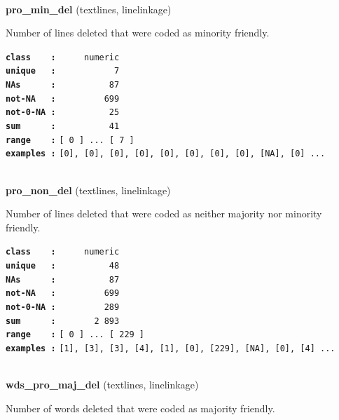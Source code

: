 \documentclass[]{article}
\begin{document}
~

\textbf{pro\_min\_del} (textlines, linelinkage)

Number of lines deleted that were coded as minority friendly.

\textbf{\texttt{class\ \ \ \ :}} \texttt{~~~~~numeric}\\
\textbf{\texttt{unique\ \ \ :}} \texttt{~~~~~~~~~~~7}\\
\textbf{\texttt{NAs\ \ \ \ \ \ :}} \texttt{~~~~~~~~~~87}\\
\textbf{\texttt{not-NA\ \ \ :}} \texttt{~~~~~~~~~699}\\
\textbf{\texttt{not-0-NA\ :}} \texttt{~~~~~~~~~~25}\\
\textbf{\texttt{sum\ \ \ \ \ \ :}} \texttt{~~~~~~~~~~41}\\
\textbf{\texttt{range\ \ \ \ :}}
\texttt{{[}\ 0\ {]}\ ...\ {[}\ 7\ {]}}\\
\textbf{\texttt{examples\ :}}
\texttt{{[}0{]},\ {[}0{]},\ {[}0{]},\ {[}0{]},\ {[}0{]},\ {[}0{]},\ {[}0{]},\ {[}0{]},\ {[}NA{]},\ {[}0{]}\ ...}\\

~

\textbf{pro\_non\_del} (textlines, linelinkage)

Number of lines deleted that were coded as neither majority nor minority
friendly.

\textbf{\texttt{class\ \ \ \ :}} \texttt{~~~~~numeric}\\
\textbf{\texttt{unique\ \ \ :}} \texttt{~~~~~~~~~~48}\\
\textbf{\texttt{NAs\ \ \ \ \ \ :}} \texttt{~~~~~~~~~~87}\\
\textbf{\texttt{not-NA\ \ \ :}} \texttt{~~~~~~~~~699}\\
\textbf{\texttt{not-0-NA\ :}} \texttt{~~~~~~~~~289}\\
\textbf{\texttt{sum\ \ \ \ \ \ :}} \texttt{~~~~~~~2~893}\\
\textbf{\texttt{range\ \ \ \ :}}
\texttt{{[}\ 0\ {]}\ ...\ {[}\ 229\ {]}}\\
\textbf{\texttt{examples\ :}}
\texttt{{[}1{]},\ {[}3{]},\ {[}3{]},\ {[}4{]},\ {[}1{]},\ {[}0{]},\ {[}229{]},\ {[}NA{]},\ {[}0{]},\ {[}4{]}\ ...}\\

~

\textbf{wds\_pro\_maj\_del} (textlines, linelinkage)

Number of words deleted that were coded as majority friendly.
\end{document}
